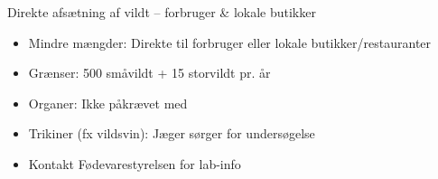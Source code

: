 \begin{frame}{Direkte afsætning af vildt – forbruger \& lokale butikker}
    \begin{itemize}
        \item Mindre mængder: Direkte til forbruger eller lokale butikker/restauranter
        \item Grænser: 500 småvildt + 15 storvildt pr. år
        \item Organer: Ikke påkrævet med
        \item Trikiner (fx vildsvin): Jæger sørger for undersøgelse
        \item Kontakt Fødevarestyrelsen for lab-info
    \end{itemize}
\end{frame}